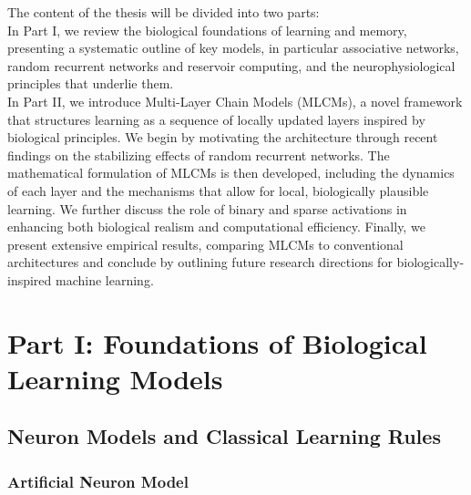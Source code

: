 \documentclass[a4paper,12pt]{report}
\begin{document}
The content of the thesis will be divided into two parts: \\ 
In Part I, we review the biological foundations of learning and memory, presenting a systematic 
outline of key models, in particular associative networks, random recurrent networks 
and reservoir computing, and the neurophysiological principles that underlie them. \\
In Part II, we introduce Multi-Layer Chain Models (MLCMs), a novel 
framework that structures learning as a sequence of locally updated layers inspired 
by biological principles. We begin by motivating the architecture through recent 
findings on the stabilizing effects of random recurrent networks. The mathematical 
formulation of MLCMs is then developed, including the dynamics of each layer and the 
mechanisms that allow for local, biologically plausible learning. We further discuss 
the role of binary and sparse activations in enhancing both biological realism and 
computational efficiency.
Finally, we present extensive empirical results, comparing MLCMs to conventional 
architectures and conclude by outlining future research directions for 
biologically-inspired machine learning.






\part*{Part I: Foundations of Biological Learning Models}




\chapter{Neuron Models and Classical Learning Rules}
\section{Artificial Neuron Model}
\end{document}

